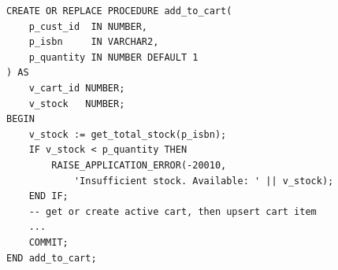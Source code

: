 \begin{lstlisting}[caption={add\_to\_cart: add a book to a customer's active cart}]
CREATE OR REPLACE PROCEDURE add_to_cart(
    p_cust_id  IN NUMBER,
    p_isbn     IN VARCHAR2,
    p_quantity IN NUMBER DEFAULT 1
) AS
    v_cart_id NUMBER;
    v_stock   NUMBER;
BEGIN
    v_stock := get_total_stock(p_isbn);
    IF v_stock < p_quantity THEN
        RAISE_APPLICATION_ERROR(-20010,
            'Insufficient stock. Available: ' || v_stock);
    END IF;
    -- get or create active cart, then upsert cart item
    ...
    COMMIT;
END add_to_cart;
\end{lstlisting}
